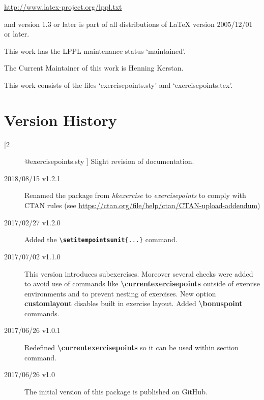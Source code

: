 \documentclass[
  twocolumn,%
  fontsize=9pt,%
  DIV=calc,%
  numbers=noendperiod%
]{scrartcl}
\makeatletter
\newcommand{\emphstyle}{\ttfamily\color{NavyBlue}\bfseries}%
\newcommand{\keyword}[1]{{\emphstyle#1}}%
\newcommand{\packageversion}{\StrBefore[2]{\expandafter\csname ver@exercisepoints.sty\endcsname}{ }}
\makeatother
\begin{document}
   \url{http://www.latex-project.org/lppl.txt}\medskip

\noindent and version 1.3 or later is part of all distributions of LaTeX version 2005/12/01 or later.\medskip

\noindent This work has the LPPL maintenance status `maintained'.\medskip

\noindent The Current Maintainer of this work is Henning Kerstan.\medskip

\noindent This work consists of the files `exercisepoints.sty' and `exercisepoints.tex'.


\section{Version History}
\begin{description}
\item[\packageversion] Slight revision of documentation.
\item[2018/08/15 v1.2.1] Renamed the package from \emph{hkexercise} to \emph{exercisepoints} to comply with CTAN rules (see \url{https://ctan.org/file/help/ctan/CTAN-upload-addendum})
\item[2017/02/27 v1.2.0] Added the \texttt{\textbackslash\keyword{setitempointsunit}\{...\}} command.
\item[2017/07/02 v1.1.0] This version introduces subexercises. Moreover several checks were added to avoid use of commands like \textcolor{NavyBlue}{\ttfamily\bfseries\textbackslash currentexercisepoints} outside of exercise environments and to prevent nesting of exercises. New option \textcolor{NavyBlue}{\ttfamily\bfseries customlayout} disables built in exercise layout. Added \textcolor{NavyBlue}{\ttfamily\bfseries\textbackslash bonuspoint} commands.
\item[2017/06/26 v1.0.1] Redefined \textcolor{NavyBlue}{\ttfamily\bfseries\textbackslash currentexercisepoints} so it can be used within section command. 
\item[2017/06/26 v1.0] The initial version of this package is published on GitHub.
\end{description}
\end{document}
